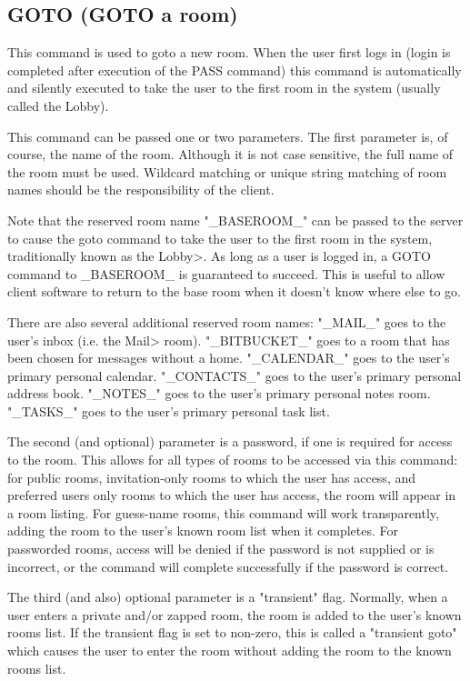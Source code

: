 \subsection{GOTO (GOTO a room)}

 This command is used to goto a new room.  When the user first logs in (login
is completed after execution of the PASS command) this command is
automatically and silently executed to take the user to the first room in the
system (usually called the Lobby).

 This command can be passed one or two parameters.  The first parameter is,
of course, the name of the room.  Although it is not case sensitive, the
full name of the room must be used.  Wildcard matching or unique string
matching of room names should be the responsibility of the client.

 Note that the reserved room name "_BASEROOM_" can be passed to the server
to cause the goto command to take the user to the first room in the system,
traditionally known as the Lobby>.   As long as a user is logged in, a
GOTO command to _BASEROOM_ is guaranteed to succeed.  This is useful to
allow client software to return to the base room when it doesn't know
where else to go.

 There are also several additional reserved room names:
 "_MAIL_" goes to the user's inbox (i.e. the Mail> room).
 "_BITBUCKET_" goes to a room that has been chosen for messages without a home.
 "_CALENDAR_" goes to the user's primary personal calendar.
 "_CONTACTS_" goes to the user's primary personal address book.
 "_NOTES_" goes to the user's primary personal notes room.
 "_TASKS_" goes to the user's primary personal task list.


 The second (and optional) parameter is a password, if one is required for
access to the room.  This allows for all types of rooms to be accessed via
this command: for public rooms, invitation-only rooms to which the user
has access, and preferred users only rooms to which the user has access, the
room will appear in a room listing.  For guess-name rooms, this command
will work transparently, adding the room to the user's known room list when
it completes.  For passworded rooms, access will be denied if the password
is not supplied or is incorrect, or the command will complete successfully
if the password is correct.

 The third (and also) optional parameter is a "transient" flag.  Normally,
when a user enters a private and/or zapped room, the room is added to the
user's known rooms list.  If the transient flag is set to non-zero, this is
called a "transient goto" which causes the user to enter the room without
adding the room to the known rooms list.

